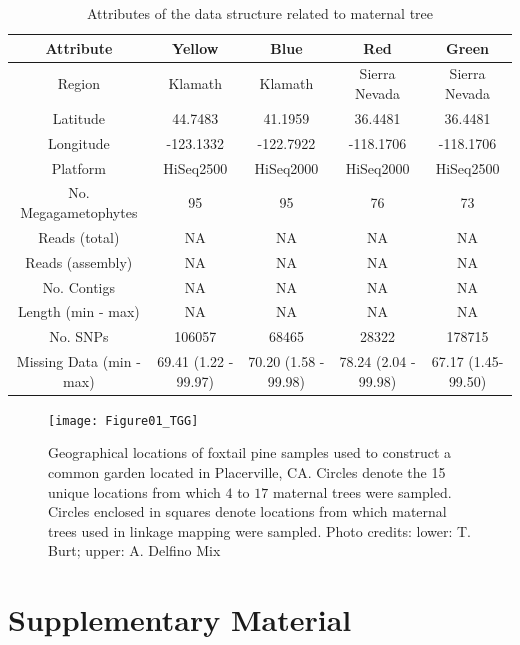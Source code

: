 \documentclass[11pt]{article}
\newcommand{\beginsupplement}{%
        \setcounter{table}{0}
        \renewcommand{\thetable}{S\arabic{table}}
        \setcounter{figure}{0}
        \renewcommand{\thefigure}{S\arabic{figure}}
        \renewcommand{\thesection}{S\arabic{section}}
        \renewcommand{\thesubsection}{S\arabic{subsection}}
     }
\begin{document}
\clearpage
\begin{landscape}

\begin{table}[ht]
\centering
\begin{tabular}{ccccc}
\toprule
Attribute & Yellow & Blue & Red & Green\\
\midrule
Region & Klamath & Klamath & Sierra Nevada & Sierra Nevada \\
Latitude & 44.7483 & 41.1959 & 36.4481 & 36.4481 \\
Longitude & -123.1332 & -122.7922 & -118.1706 & -118.1706 \\
Platform & HiSeq2500 & HiSeq2000 & HiSeq2000 & HiSeq2500 \\
No. Megagametophytes & 95 & 95 & 76 & 73 \\
Reads (total) & NA & NA & NA & NA \\
Reads (assembly) & NA & NA & NA & NA \\
No. Contigs & NA & NA & NA & NA \\
Length (min - max) & NA & NA & NA & NA \\
No. SNPs & 106057 & 68465 & 28322 & 178715 \\
Missing Data (min - max) & 69.41 (1.22 - 99.97) & 70.20 (1.58 - 99.98) & 78.24 (2.04 - 99.98) & 67.17 (1.45-99.50) \\
\bottomrule
\end{tabular}
\caption{Attributes of the data structure related to maternal tree} 
\label{t:label}
\end{table}
\end{landscape}

\clearpage

\begin{figure}[ht]
\centering
\texttt{[image: Figure01\_TGG]}
\caption{Geographical locations of foxtail pine samples used to construct a common garden located in Placerville, CA. Circles 
denote the 15 unique locations from which $4$ to $17$ maternal trees were sampled. Circles enclosed in squares denote 
locations from which maternal trees used in linkage mapping were sampled. Photo credits: lower: T. Burt; upper: A. Delfino Mix}
\label{f:Figure01_TGG}
\end{figure}

\clearpage

\beginsupplement

\section*{Supplementary Material}
\end{document}

